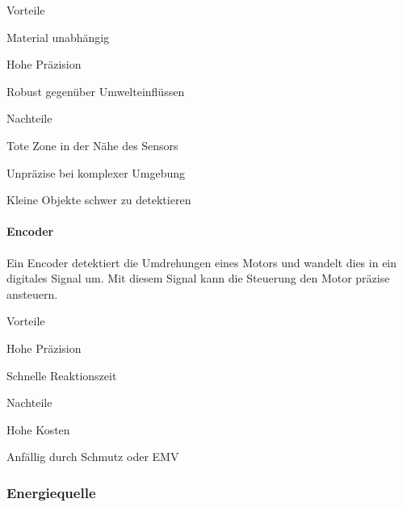 \documentclass[../main.tex]{subfiles}
\begin{document}
\begin{minipage}[t]{0.48\textwidth}
\begin{items}
  \item [Vorteile]
  \item Material unabhängig
  \item Hohe Präzision
  \item Robust gegenüber Umwelteinflüssen
\end{items}
\end{minipage}
\hfill
\begin{minipage}[t]{0.48\textwidth}
\begin{items}
  \item [Nachteile]
  \item Tote Zone in der Nähe des Sensors
  \item Unpräzise bei komplexer Umgebung
  \item Kleine Objekte schwer zu detektieren
\end{items}
\end{minipage}

\paragraph{Encoder}
Ein Encoder detektiert die Umdrehungen eines Motors und wandelt dies in ein digitales Signal um. Mit diesem Signal kann die Steuerung den Motor präzise ansteuern.
 

\begin{minipage}[t]{0.48\textwidth}
\begin{items}
  \item [Vorteile]
  \item Hohe Präzision
  \item Schnelle Reaktionszeit
\end{items}
\end{minipage}
\hfill
\begin{minipage}[t]{0.48\textwidth}
\begin{items}
  \item [Nachteile]
  \item Hohe Kosten
  \item Anfällig durch Schmutz oder EMV
\end{items}
\end{minipage}


\subsubsection{Energiequelle}
\end{document}
